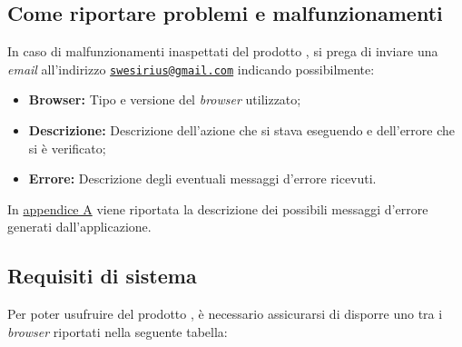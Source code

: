 \subsection{Come riportare problemi e malfunzionamenti}

In caso di malfunzionamenti inaspettati del prodotto \progetto{}, si prega di inviare una \textit{email} all'indirizzo
\href{mailto:swesirius@gmail.com}{\nolinkurl{swesirius@gmail.com}} indicando possibilmente:

\begin{itemize}
\item \textbf{Browser:} Tipo e versione del \textit{browser} utilizzato;
\item \textbf{Descrizione:} Descrizione dell'azione che si stava eseguendo e dell'errore che si è verificato;
\item \textbf{Errore:} Descrizione degli eventuali messaggi d'errore ricevuti.
\end{itemize}

In \hyperref[errori]{appendice A} viene riportata la descrizione dei possibili messaggi d'errore generati dall'applicazione.

\subsection{Requisiti di sistema}
Per poter usufruire del prodotto \progetto{}, è necessario assicurarsi di disporre uno tra i \textit{browser} riportati nella seguente tabella:

